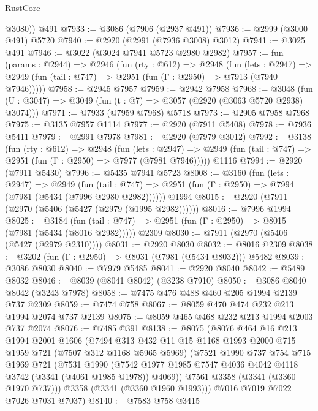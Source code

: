 \begin{lexlean}{RustCore}
\begin{coremodule}
        @3080))
    @491
@7933 := @3086 (@7906 (@2937 @491))
@7936 := @2999 (@3000 @491) @5720
@7940 := @2920 (@2991 (@7936 @3008) @3012)
@7941 := @3025 @491
@7946 := @3022 (@3024 @7941 @5723 @2980 @2982)
@7957 := fun (params : @2944) =>
  @2946
    (fun (rty : @612) =>
    @2948
      (fun (lets : @2947) =>
      @2949 (fun (tail : @747) => @2951 (fun (Γ : @2950) => @7913 (@7940 @7946)))))
@7958 := @2945 @7957
@7959 := @2942 @7958
@7968 := @3048 (fun (U : @3047) => @3049 (fun (t : @7) => @3057 (@2920 (@3063 @5720 @2938) @3074)))
@7971 := @7933 (@7959 @7968) @5718
@7973 := @2905 @7958 @7968
@7975 := @3135 @7957 @1114
@7977 := @2920 (@7911 @5408)
@7978 := @7936 @5411
@7979 := @2991 @7978
@7981 := @2920 (@7979 @3012)
@7992 := @3138
    (fun (rty : @612) =>
    @2948
      (fun (lets : @2947) =>
      @2949 (fun (tail : @747) => @2951 (fun (Γ : @2950) => @7977 (@7981 @7946)))))
    @1116
@7994 := @2920 (@7911 @5430)
@7996 := @5435 @7941 @5723
@8008 := @3160
    (fun (lets : @2947) =>
    @2949
      (fun (tail : @747) => @2951 (fun (Γ : @2950) => @7994 (@7981 (@5434 (@7996 @2980 @2982))))))
    @1994
@8015 := @2920 (@7911 (@2970 (@5406 (@5427 (@2979 (@1995 @2982))))))
@8016 := @7996 @1994
@8025 := @3184
    (fun (tail : @747) => @2951 (fun (Γ : @2950) => @8015 (@7981 (@5434 (@8016 @2982)))))
    @2309
@8030 := @7911 (@2970 (@5406 (@5427 (@2979 @2310))))
@8031 := @2920 @8030
@8032 := @8016 @2309
@8038 := @3202 (fun (Γ : @2950) => @8031 (@7981 (@5434 @8032))) @5482
@8039 := @3086 @8030
@8040 := @7979 @5485
@8041 := @2920 @8040
@8042 := @5489 @8032
@8046 := @8039 (@8041 @8042) (@3238 @7910)
@8050 := @3086 @8040 @8042 (@3243 @7978)
@8058 := @7475 @476 @488 @460 @205 @1994 @2139 @737 @2309
@8059 := @7474 @758
@8067 := @8059 @470 @474 @232 @213 @1994 @2074 @737 @2139
@8075 := @8059 @465 @468 @232 @213 @1994 @2003 @737 @2074
@8076 := @7485 @391
@8138 := @8075
    (@8076
      @464
      @16
      @213
      @1994
      @2001
      @1606
      (@7494
        @313
        @432
        @11
        @15
        @1168
        @1993
        @2000
        @715
        @1959
        @721
        (@7507 @312 @1168 @5965 @5969)
        (@7521
          @1990
          @737
          @754
          @715
          @1969
          @721
          (@7531
            @1990
            (@7542 @1977 @1985 @7547 @4036 @4042 @4118 @3742 (@3341 (@4061 @1985 @1978)) @4069))
          @7561
          @3358
          (@3341 (@3360 @1970 @737)))
        @3358
        (@3341 (@3360 @1960 @1993)))
      @7016
      @7019
      @7022
      @7026
      @7031
      @7037)
@8140 := @7583 @758 @3415

\end{coremodule}
\end{lexlean}
